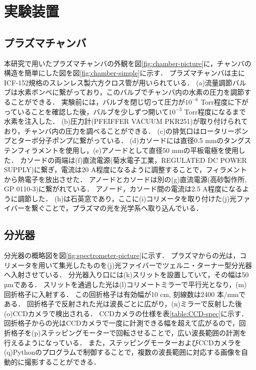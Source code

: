 \chapter{実験装置}
\section{プラズマチャンバ}
本研究で用いたプラズマチャンバの外観を図\ref{fig:chamber-picture}に，チャンバの構造を簡単にした図を図\ref{fig:chamber-simple}に示す．
プラズマチャンバは主にICF-152規格のスレンレス製六方クロス管が用いられている．
(a)流量調節バルブは水素ボンベに繋がっており，このバルブでチャンバ内の水素の圧力を調節することができる．
実験前には，バルブを閉じ切って圧力が$10^{-6}$ Torr程度に下がっていることを確認した後，バルブを少しずつ開いて$10^{-3}$ Torr程度になるまで水素を注入した．
(b)圧力計(PFEIFFER VACUUM PKR251)が取り付けられており，チャンバ内の圧力を調べることができる．
(c)の排気口はロータリーポンプとターボ分子ポンプに繋がっている．
(d)カソードには直径0.5 mmのタングステンフィラメントを使用し，(e)アノードとして直径50 mmの平板電極を使用した．
カソードの両端は(f)直流電源(菊水電子工業，REGULATED DC POWER SUPPLY)に繋ぎ，電流は20 A程度になるように調整することで，フィラメントから熱電子を放出させた．
アノードとカソードは別の(g)直流電源(高砂製作所, GP 0110-3)に繋がれている．
アノード，カソード間の電流は2.5 A程度になるように調節した．
(h)は石英窓であり，ここに(i)コリメータを取り付けた(j)光ファイバーを繋ぐことで，プラズマの光を光学系へ取り込んでいる．

\section{分光器}
分光器の概略図を図\ref{fig:spectrometer-picture}に示す．
プラズマからの光は，コリメータを用いて集光したものを(j)光ファイバーでツェルニ・ターナー型分光器へ入射させている．
分光器入り口には(k)スリットを設置していて，その幅は50 µmである．
スリットを通過した光は(l)コリメートミラーで平行光となり，(m)回折格子に入射する．
この回折格子は有効幅が10 cm, 刻線数は2400 本/mmである．
回折格子で反射された光は波長ごとに広がり，(n)ミラーで反射した後(o)CCDカメラで検出される．
CCDカメラの仕様\cite{CCD-spec}を表\ref{table:CCD-spec}に示す．
回折格子からの光はCCDカメラで一度に計測できる幅を超えて広がるので，回折格子を(p)ステッピングモーターで回転させることで，広い波長範囲の計測を行えるようになっている．
また，ステッピングモーターおよびCCDカメラを(q)Pythonのプログラムで制御することで，複数の波長範囲に対応する画像を自動的に撮影することができる．